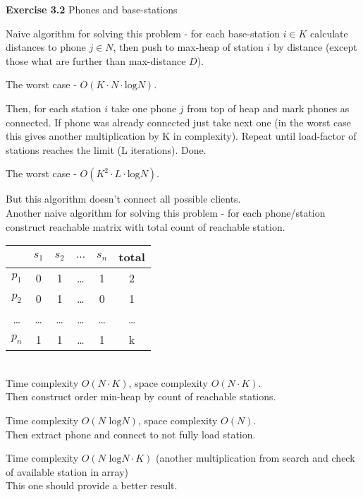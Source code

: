 \documentclass{article}
\begin{document}
\textbf{Exercise 3.2} Phones and base-stations

Naive algorithm for solving this problem - for each base-station $i \in K$ calculate
distances to phone $j \in N$, then push to max-heap of station $i$ by
distance (except those what are further than max-distance $D$).

The worst case - $O(K \cdot N \cdot \text{log} N)$.

Then, for each station $i$ take one phone $j$ from top of heap and mark phones as
connected. If phone was already connected just take next one (in the worst case
this gives another multiplication by K in complexity). Repeat until load-factor of
stations reaches the limit (L iterations). Done.

The worst case - $O(K^2 \cdot L \cdot \text{log} N)$.

But this algorithm doesn't connect all possible clients.\\

Another naive algorithm for solving this problem - for each phone/station construct
reachable matrix with total count of reachable station.\\

\begin{tabular}{|c|c|c|c|c|c|}
  \hline
        & $s_1$ & $s_2$ & $\dots$ & $s_n$ & total\\
  \hline
  $p_1$ & 0 & 1 & \dots & 1 & 2\\
  $p_2$ & 0 & 1 & \dots & 0 & 1\\
  \dots & \dots & \dots & \dots & \dots & \dots\\
  $p_n$ & 1 & 1 & \dots & 1 & k\\
  \hline
\end{tabular}\\

Time complexity $O(N \cdot K)$, space complexity $O(N \cdot K)$.\\

Then construct order min-heap by count of reachable stations.

Time complexity $O(N \text{ log}N)$, space complexity $O(N)$.\\

Then extract phone and connect to not fully load station.

Time complexity $O(N \text{ log}N \cdot K)$ (another multiplication from search
and check of available station in array)\\

This one should provide a better result.\\


\end{document}
